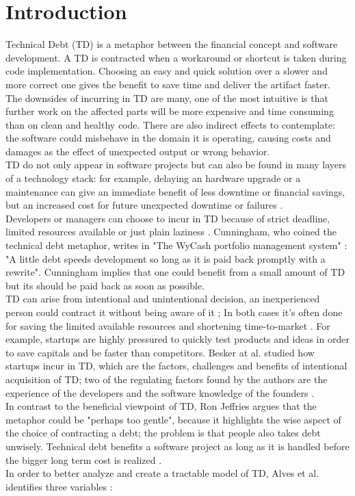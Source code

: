 \chapter{Introduction}
Technical Debt (TD) is a metaphor between the financial concept and software development.
A TD is contracted when a workaround or shortcut is taken during code implementation.
Choosing an easy and quick solution over a slower and more correct one gives the benefit to save time and deliver the artifact faster. 
\\
The downsides of incurring in TD are many, one of the most intuitive is that further work on the affected parts will be more expensive and time consuming than on clean and healthy code. There are also indirect effects to contemplate: the software could misbehave in the domain it is operating, causing costs and damages as the effect of unexpected output or wrong behavior.
\\
TD do not only appear in software projects but can also be found in many layers of a technology stack: for example, delaying an hardware upgrade or a maintenance can give an immediate benefit of less downtime or financial savings, but an increased cost for future unexpected downtime or failures \cite{allman2012managing}.
\\
Developers or managers can choose to incur in TD because of strict deadline, limited resources available or just plain laziness \cite{hinsen2015technical,allman2012managing}. Cunningham, who coined the technical debt metaphor, writes in "The WyCash portfolio management system" \cite{cunningham1992wycash}: "A little debt speeds development so long as it is paid back promptly with a rewrite". Cunningham implies that one could benefit from a small amount of TD but its should be paid back as soon as possible. 
\\
TD can arise from intentional and unintentional decision, an inexperienced person could contract it without being aware of it \cite{hinsen2015technical}; In both cases it's often done for saving the limited available resources and shortening time-to-market \cite{tom2012consolidated}. For example, startups are highly pressured to quickly test products and ideas in order to save capitals and be faster than competitors.
Besker at al. studied how startups incur in TD, which are the factors, challenges and benefits of intentional acquisition of TD; two of the regulating factors found by the authors are the experience of the developers and the software knowledge of the founders \cite{besker2018embracing}.
\\
In contrast to the beneficial viewpoint of TD, Ron Jeffries argues that the metaphor could be "perhaps too gentle", because it highlights the wise aspect of the choice of contracting a debt; the problem is that people also takes debt unwisely.
Technical debt benefits a software project as long as it is handled before the bigger long term cost is realized \cite{guo2016exploring}.
\\
In order to better analyze and create a tractable model of TD, Alves et al. identifies three variables \cite{martini2018technical}: 


